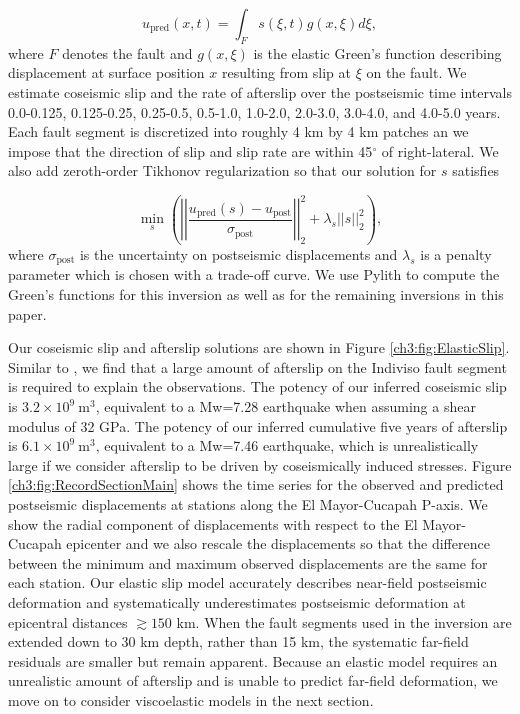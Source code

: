 \begin{equation}\label{ch3:eq:ElasticForward}
  u_\mathrm{pred}(x,t) = \int_F s(\xi,t)g(x,\xi)d\xi, 
\end{equation}           
where $F$ denotes the fault and $g(x,\xi)$ is the elastic Green's function describing displacement at surface position $x$ resulting from slip at $\xi$ on the fault.  We estimate coseismic slip and the rate of afterslip over the postseismic time intervals 0.0-0.125, 0.125-0.25, 0.25-0.5, 0.5-1.0, 1.0-2.0, 2.0-3.0, 3.0-4.0, and 4.0-5.0 years.  Each fault segment is discretized into roughly 4 km by 4 km patches an we impose that the direction of slip and slip rate are within 45$^\circ$ of right-lateral. We also add zeroth-order Tikhonov regularization so that our solution for $s$ satisfies

\begin{equation}\label{ch3:eq:ElasticObjective}
  \min_s \left(\left|\left|\frac{u_\mathrm{pred}(s) - u_\mathrm{post}}                
                                {\sigma_\mathrm{post}}\right|\right|_2^2 + 
                                \lambda_s||s||_2^2\right),
\end{equation}
where $\sigma_\mathrm{post}$ is the uncertainty on postseismic displacements and $\lambda_s$ is a penalty parameter which is chosen with a trade-off curve.  We use Pylith \citep{Aagaard2013} to compute the Green's functions for this inversion as well as for the remaining inversions in this paper. 

Our coseismic slip and afterslip solutions are shown in Figure \ref{ch3:fig:ElasticSlip}.  Similar to \citet{Rollins2015}, we find that a large amount of afterslip on the Indiviso fault segment is required to explain the observations. The potency of our inferred coseismic slip is $3.2\times10^9\ \mathrm{m}^3$, equivalent to a Mw=7.28 earthquake when assuming a shear modulus of 32 GPa.  The potency of our inferred cumulative five years of afterslip is $6.1\times10^9\ \mathrm{m}^3$, equivalent to a Mw=7.46 earthquake, which is unrealistically large if we consider afterslip to be driven by coseismically induced stresses.  Figure \ref{ch3:fig:RecordSectionMain} shows the time series for the observed and predicted postseismic displacements at stations along the El Mayor-Cucapah P-axis.  We show the radial component of displacements with respect to the El Mayor-Cucapah epicenter and we also rescale the displacements so that the difference between the minimum and maximum observed displacements are the same for each station.  Our elastic slip model accurately describes near-field postseismic deformation and systematically underestimates postseismic deformation at epicentral distances ${\gtrsim}150$ km.  When the fault segments used in the inversion are extended down to 30 km depth, rather than 15 km, the systematic far-field residuals are smaller but remain apparent. Because an elastic model requires an unrealistic amount of afterslip and is unable to predict far-field deformation, we move on to consider viscoelastic models in the next section.  

